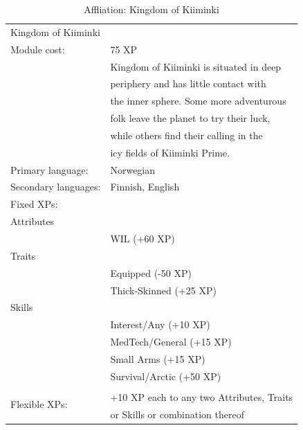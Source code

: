 \documentclass{tufte-book}
\begin{document}
\bigskip
\begin{table}
\begin{minipage}{\textwidth}
\begin{center}
\begin{tabular}{ll}
\toprule
\multicolumn{2}{l}{Kingdom of Kiiminki} \\
Module cost: & 75 XP \\
\multirow{6}{*}[0.75em]{} & Kingdom of Kiiminki is situated in deep  \\
                          & periphery and has little contact with    \\
                          & the inner sphere. Some more adventurous  \\
                          & folk leave the planet to try their luck, \\
                          & while others find their calling in the   \\
                          & icy fields of Kiiminki Prime.            \\
Primary language: & Norwegian \\
Secondary languages: & Finnish, English \\
Fixed XPs: & \\
\quad Attributes & \\
& WIL (+60 XP) \\
\quad Traits & \\
& Equipped (-50 XP) \\
& Thick-Skinned (+25 XP) \\
\quad Skills & \\
& Interest/Any (+10 XP) \\
& MedTech/General (+15 XP) \\
& Small Arms (+15 XP) \\
& Survival/Arctic (+50 XP) \\

\multirow{3}{*}[0.75em]{Flexible XPs:} \\
                                       & +10 XP each to any two Attributes, Traits \\
                                       & or Skills or combination thereof \\

\bottomrule
\end{tabular}
\end{center}
\end{minipage}
\caption{Affliation: Kingdom of Kiiminki}
\end{table}
\end{document}
